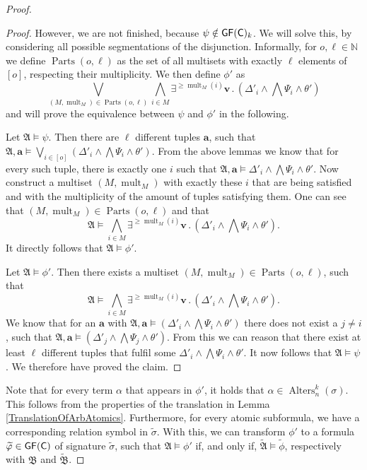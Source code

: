 \begin{proof}
\begin{proof}
		However, we are not finished, because $\psi \notin \mathsf{GF}(\mathsf{C})_k$.
		We will solve this, by considering all possible segmentations of the disjunction.
		Informally, for $o,\ell\in\mathbb N$ we define $\operatorname{Parts}(o, \ell)$ as the set of all multisets with exactly $\ell$ elements of $[o]$, respecting their multiplicity.
		We then define $\phi'$ as
		$$\bigvee_{(M,\operatorname{mult}_M)\in \operatorname{Parts}(o,\ell)} \bigwedge_{i\in M} \exists^{\geq \operatorname{mult}_M(i)}\mathbf v\operatorname{.} (\Delta'_i\land\bigwedge \Psi_i \land \theta')$$
		and will prove the equivalence between $\psi$ and $\phi'$ in the following. 
		
		Let $\mathfrak A\models \psi$.
		Then there are $\ell$ different tuples $\mathbf a$, such that $\mathfrak A,\mathbf a \models \bigvee_{i\in[o]}(\Delta'_i\land\bigwedge\Psi_i\land\theta')$.
		From the above lemmas we know that for every such tuple, there is exactly one $i$ such that $\mathfrak A,\mathbf a\models \Delta'_i\land\bigwedge \Psi_i\land \theta'$.
		Now construct a multiset $(M,\operatorname{mult}_M)$ with exactly these $i$ that are being satisfied and with the multiplicity of the amount of tuples satisfying them.
		One can see that $(M,\operatorname{mult}_M)\in \operatorname{Parts}(o,\ell)$ and that 
		$$\mathfrak A \models \bigwedge_{i\in M}\exists^{\geq\operatorname{mult}_M(i)}\mathbf v\operatorname{.} (\Delta'_i\land \bigwedge\Psi_i\land \theta').$$
		It directly follows that $\mathfrak A\models \phi'$.
		
		Let $\mathfrak A\models \phi'$.
		Then there exists a multiset $(M,\operatorname{mult}_M)\in \operatorname{Parts}(o,\ell)$, such that 
		$$\mathfrak A \models \bigwedge_{i\in M}\exists^{\geq\operatorname{mult}_M(i)}\mathbf v\operatorname{.} (\Delta'_i\land \bigwedge\Psi_i\land \theta').$$
		We know that for an $\mathbf a$ with $\mathfrak A,\mathbf a\models (\Delta'_i\land \bigwedge\Psi_i\land \theta')$ there does not exist a $j\neq i$, such that $\mathfrak A,\mathbf a\models (\Delta'_j\land \bigwedge\Psi_j\land \theta')$.
		From this we can reason that there exist at least $\ell$ different tuples that fulfil some $\Delta'_i\land\bigwedge\Psi_i\land\theta'$.
		It now follows that $\mathfrak A\models\psi$.
		We therefore have proved the claim.
	\end{proof}
	
	Note that for every term $\alpha$ that appears in $\phi'$, it holds that $\alpha\in \operatorname{Alters}^k_n(\sigma)$.
	This follows from the properties of the translation in Lemma \ref{TranslationOfArbAtomics}.
	Furthermore, for every atomic subformula, we have a corresponding relation symbol in $\widetilde{\sigma}$.
	With this, we can transform $\phi'$ to a formula $\widetilde{\varphi}\in\mathsf{GF}(\mathsf{C})$ of signature $\widetilde{\sigma}$, such that $\mathfrak A\models \phi'$ if, and only if, $\widetilde{\mathfrak A}\models \widetilde{\phi}$, respectively with $\mathfrak B$ and $\widetilde{\mathfrak B}$.
	

\end{proof}
